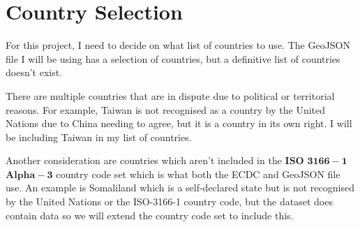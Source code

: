 \documentclass{report}
\begin{document}
\section{Country Selection}
For this project, I need to decide on what list of countries to use. The GeoJSON file I will be using has a selection of countries, but a definitive list of countries doesn't exist.

There are multiple countries that are in dispute due to political or territorial reasons. For example, Taiwan is not recognised as a country by the United Nations due to China needing to agree, but it is a country in its own right. I will be including Taiwan in my list of countries.

Another consideration are countries which aren't included in the $\mathbf{ISO}$ $\mathbf{3166-1}$ $\mathbf{Alpha-3}$ country code set which is what both the ECDC and GeoJSON file use. An example is Somaliland which is a self-declared state but is not recognised by the United Nations or the ISO-3166-1 country code, but the dataset does contain data so we will extend the country code set to include this.
\end{document}
